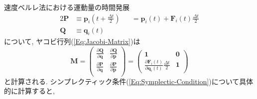 速度ベルレ法における運動量の時間発展
\begin{alignat}{2}
  \bm{P}
  &\equiv
  \bm{p}_{i}\left(t+ \frac{\Delta t}{2}\right)
  &&=
  \bm{p}_{i}(t) + \bm{F}_{i}(t) \frac{\Delta t}{2}
  \\
  \bm{Q}
  &\equiv
  \bm{q}_{i} (t)
\end{alignat}
について, ヤコビ行列(\ref{Eq:Jacobi-Matrix})は
\begin{equation}
  \bm{M}
  =
  \begin{pmatrix}
    \frac{\partial \bm{Q}}{\partial \bm{q}} &
    \frac{\partial \bm{Q}}{\partial \bm{p}} \\
    \frac{\partial \bm{P}}{\partial \bm{q}} &
    \frac{\partial \bm{P}}{\partial \bm{p}} \\
  \end{pmatrix}
  =
  \begin{pmatrix}
    \bm{1} &
    \bm{0} \\
    \frac{\partial \bm{F}_{i}(t)}{\partial \bm{q}_{i}(t)} \frac{\Delta t}{2} &
    \bm{1}
  \end{pmatrix}
\end{equation}
と計算される. シンプレクティック条件(\ref{Eq:Symplectic-Condition})について具体的に計算すると, 
